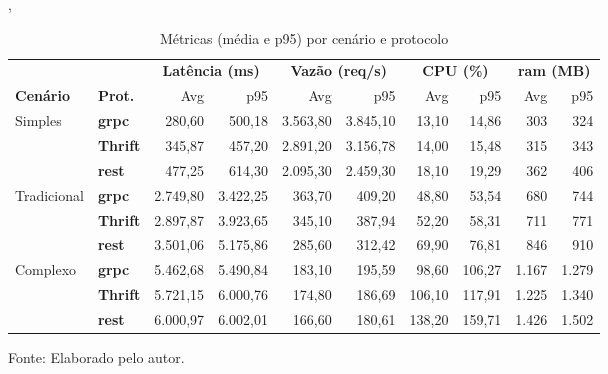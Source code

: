 \begin{table}[H]
\centering
\caption{Métricas (média e p95) por cenário e protocolo}
\label{tab:res_todos_agrupados},
\setlength{\tabcolsep}{4pt}
\renewcommand{\arraystretch}{1.15}
\begin{tabularx}{\linewidth}{l X | r | r | r | r | r | r | r | r |}
\hline
\multicolumn{2}{c}{} & \multicolumn{2}{c}{\textbf{Latência (ms)}} & \multicolumn{2}{c}{\textbf{Vazão (req/s)}} & \multicolumn{2}{c}{\textbf{CPU (\%)}} & \multicolumn{2}{c}{\textbf{\acrshort{ram} (MB)}} \\
\cline{3-10}
\textbf{Cenário} & \textbf{Prot.} & Avg & p95 & Avg & p95 & Avg & p95 & Avg & p95 \\
\hline
\multirow{3}{*}{Simples}
  & \textbf{\acrshort{grpc}}   & 280,60   & 500,18   & 3.563,80 & 3.845,10 & 13,10  & 14,86  & 303   & 324  \\
  & \textbf{Thrift} & 345,87   & 457,20   & 2.891,20 & 3.156,78 & 14,00  & 15,48  & 315   & 343  \\
  & \textbf{\gls{rest}}   & 477,25   & 614,30   & 2.095,30 & 2.459,30 & 18,10  & 19,29  & 362   & 406  \\
\hline
\multirow{3}{*}{Tradicional}
  & \textbf{\acrshort{grpc}}   & 2.749,80 & 3.422,25 & 363,70   & 409,20   & 48,80  & 53,54  & 680   & 744  \\
  & \textbf{Thrift} & 2.897,87 & 3.923,65 & 345,10   & 387,94   & 52,20  & 58,31  & 711   & 771  \\
  & \textbf{\gls{rest}}   & 3.501,06 & 5.175,86 & 285,60   & 312,42   & 69,90  & 76,81  & 846   & 910  \\
\hline
\multirow{3}{*}{Complexo}
  & \textbf{\acrshort{grpc}}   & 5.462,68 & 5.490,84 & 183,10   & 195,59   & 98,60  & 106,27 & 1.167 & 1.279 \\
  & \textbf{Thrift} & 5.721,15 & 6.000,76 & 174,80   & 186,69   & 106,10 & 117,91 & 1.225 & 1.340 \\
  & \textbf{\gls{rest}}   & 6.000,97 & 6.002,01 & 166,60   & 180,61   & 138,20 & 159,71 & 1.426 & 1.502 \\
\hline
\end{tabularx}
{\par \raggedright \footnotesize Fonte: Elaborado pelo autor.\par}
\end{table}

